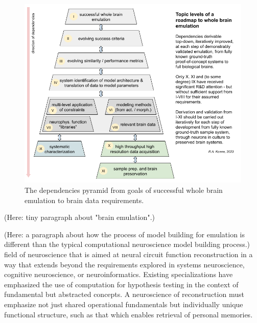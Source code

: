 \documentclass{ldr-article}
\begin{document}
\begin{figure}
    \centering
    \includegraphics[width=1\linewidth]{figures/Deriving-whole-brain-emulation.png}
    \caption{The dependencies pyramid from goals of successful whole brain emulation to brain data requirements.
}
    \label{fig:dependencies-pyramid}
\end{figure}

(Here: tiny paragraph about "brain emulation".)

(Here: a paragraph about how the process of model building for emulation is different than the typical computational neuroscience model building process.)
field of neuroscience that is aimed at neural circuit function reconstruction in a way that extends beyond the requirements explored in systems neuroscience, cognitive neuroscience, or neuroinformatics. Existing specializations have emphasized the use of computation for hypothesis testing in the context of fundamental but abstracted concepts. A neuroscience of reconstruction must emphasize not just shared operational fundamentals but individually unique functional structure, such as that which enables retrieval of personal memories.
\end{document}
